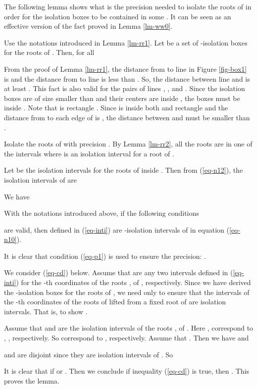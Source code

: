 \documentclass[amsthm]{JSC_LaTex_2007_Mar_12/elsart}
\def\bref#1{(\ref{#1})}
\begin{document}
The following lemma shows what is the precision needed to isolate
the roots of  in order for the isolation boxes to be
contained in some . It can be seen as an effective
version of the fact  proved in
Lemma \ref{lm-ww0}.
\begin{lem}\label{lm-rr2}
Use the notations introduced in Lemma \ref{lm-rr1}. Let  be a set of -isolation boxes for
the roots  of . Then, for all


\end{lem}
\begin{pf}
From the proof of Lemma \ref{lm-rr1},  the distance from  to
line  in Figure \ref{fig-box1} is  and the distance from
 to line  is less than . So, the
distance between line  and  is at least
. This fact is also valid for the pairs of lines
, , and . Since the isolation boxes
 are of size smaller than  and their centers are
inside , the boxes  must be inside .
Note that  is rectangle . Since  is
inside both  and rectangle  and the distance from
 to each edge of  is , the distance
between   and  must be smaller than .
\end{pf}

Isolate the roots of  with precision
. By Lemma \ref{lm-rr2}, all the roots are in one
of the intervals  where  is an isolation interval
for a root  of .

Let  be the
isolation intervals for the roots  of 
inside .
Then from \bref{eq-n12}, the isolation intervals of
 are



We have
\begin{lem}With the notations introduced above, if the following
conditions


are valid, then  defined in \bref{eq-inti} are
-isolation intervals of  in equation \bref
{eq-n10}.
\end{lem}
\begin{pf}
It is clear that condition \bref{eq-p1} is used to ensure the
precision: .

We consider \bref{eq-cd} below. Assume that  are any two intervals defined in \bref{eq-inti}
for the -th coordinates of the roots
,
 of , respectively.
Since we have derived the -isolation boxes for the roots
of , we need only to ensure that the intervals of the
-th coordinates of the roots of  lifted from a
fixed root of  are isolation intervals. That is, to show
.

Assume that  and
 are the isolation intervals
of the roots ,  of . Here ,
 correspond to ,
, respectively. So 
correspond to , respectively. Assume that
. Then we have {\small
} and


 and  are disjoint since they are isolation intervals of
. So

It is clear that  if  or .
Then we conclude if inequality \bref{eq-cd} is true, then
. This proves the lemma.
\end{pf}
\end{document}
